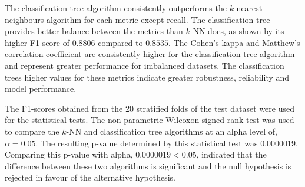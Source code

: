 \documentclass[conference]{IEEEtran}
\begin{document}
	\begin{table}[htbp]
		\renewcommand{\arraystretch}{1.3}
		\caption{Classification Algorithms Test Performance}
		\label{tab:results}
		\centering
	\end{table}
	 The classification tree algorithm consistently outperforms the $k$-nearest neighbours algorithm for each metric except recall. The classification tree provides better balance between the metrics than $k$-NN does, as shown by its higher F1-score of $0.8806$ compared to $0.8535$. The Cohen's kappa and Matthew's correlation coefficient are consistently higher for the classification tree algorithm and represent greater performance for imbalanced datasets. The classification trees higher values for these metrics indicate greater robustness, reliability and model performance. 
	 
	 The F1-scores obtained from the 20 stratified folds of the test dataset were used for the statistical tests. The non-parametric Wilcoxon signed-rank test was used to compare the $k$-NN and classification tree algorithms at an alpha level of, $\alpha=0.05$. The resulting p-value determined by this statistical test was $0.0000019$. Comparing this p-value with alpha, $0.0000019 < 0.05$, indicated that the difference between these two algorithms is significant and the null hypothesis is rejected in favour of the alternative hypothesis. 
	 
\end{document}
